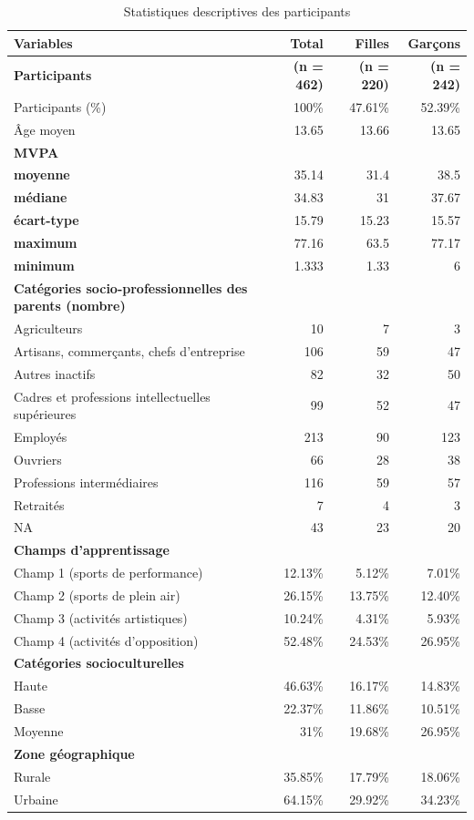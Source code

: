 \documentclass[12pt,a4paper]{article}
\begin{document}
	\begin{table}[H]
		\centering
		\begin{tabular}{lrrr}
			\toprule
			\textbf{Variables} & \textbf{Total} & \textbf{Filles} & \textbf{Garçons} \\
			\midrule
			\textbf{Participants} & \textbf{(n = 462)} & \textbf{(n = 220)} & \textbf{(n = 242)} \\
			Participants (\%) & 100\% & 47.61\% & 52.39\%\\
			Âge moyen & 13.65 & 13.66 & 13.65 \\
			\midrule
			\textbf{MVPA}\\
			\textbf{moyenne} & 35.14 & 31.4 & 38.5\\
			\textbf{médiane} & 34.83 & 31 & 37.67\\
			\textbf{écart-type} & 15.79 &  15.23& 15.57 \\
			\textbf{maximum} & 77.16 & 63.5 & 77.17 \\
			\textbf{minimum} &1.333 & 1.33 & 6\\
			\midrule
			\textbf{Catégories socio-professionnelles des parents (nombre)} \\
			Agriculteurs & 10 & 7 & 3 \\
			Artisans, commerçants, chefs d'entreprise & 106 & 59 & 47 \\
			Autres inactifs & 82 & 32 & 50 \\
			Cadres et professions intellectuelles supérieures & 99 & 52 & 47 \\
			Employés & 213 & 90 & 123 \\
			Ouvriers & 66 & 28 & 38 \\
			Professions intermédiaires & 116 & 59 & 57 \\
			Retraités & 7 & 4 & 3 \\
			NA & 43 & 23 & 20 \\
			\midrule
			\textbf{Champs d'apprentissage} \\
			Champ 1 (sports de performance) & 12.13\% & 5.12\% & 7.01\% \\
			Champ 2 (sports de plein air) & 26.15\% & 13.75\% & 12.40\% \\
			Champ 3 (activités artistiques) & 10.24\% & 4.31\% & 5.93\% \\
			Champ 4 (activités d'opposition) & 52.48\% & 24.53\% & 26.95\% \\
			\midrule
			\textbf{Catégories socioculturelles} \\
			Haute & 46.63\% & 16.17\% & 14.83\% \\
			Basse & 22.37\% & 11.86\% & 10.51\% \\
			Moyenne & 31\% & 19.68\% & 26.95\% \\
			\midrule
			\textbf{Zone géographique} \\
			Rurale & 35.85\% & 17.79\% & 18.06\% \\
			Urbaine & 64.15\% & 29.92\% & 34.23\% \\
			\bottomrule
		\end{tabular}
		\caption{Statistiques descriptives des participants}
		\label{tab:descriptive_stats}
	\end{table}
	
\end{document}
